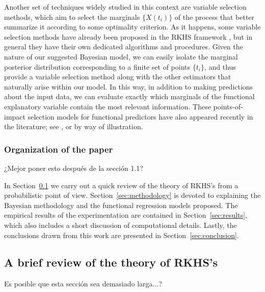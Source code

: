 \documentclass[ba]{imsart}
\numberwithin{equation}{section}
\theoremstyle{plain}
\newenvironment{comment}
{
\noindent \em \color{red}
}
{
\color{black}
}
\begin{document}
Another set of techniques widely studied in this context are variable selection methods, which aim to select the marginals \(\{X(t_i)\}\) of the process that better summarize it according to some optimality criterion. As it happens, some variable selection methods have already been proposed in the RKHS framework \citep[see for example][]{berrendero2019rkhs}, but in general they have their own dedicated algorithms and procedures. Given the nature of our suggested Bayesian model, we can easily isolate the marginal posterior distribution corresponding to a finite set of points \(\{t_i\}\), and thus provide a variable selection method along with the other estimators that naturally arise within our model. In this way, in addition to making predictions about the input data, we can evaluate exactly which marginals of the functional explanatory variable contain the most relevant information. These points-of-impact selection models for functional predictors have also appeared recently in the literature; see \citet{poss2020superconsistent}, \citet{berrendero2016variable} or \citet{ferraty2010most} by way of illustration.

\subsubsection{Organization of the paper}

\begin{comment}
¿Mejor poner esto después de la sección 1.1?
\end{comment}

In Section~\ref{sec:rkhs} we carry out a quick review of the theory of RKHS's from a probabilistic point of view. Section~\ref{sec:methodology} is devoted to explaining the Bayesian methodology and the functional regression models proposed. The empirical results of the experimentation are contained in Section~\ref{sec:results}, which also includes a short discussion of computational details. Lastly, the conclusions drawn from this work are presented in Section~\ref{sec:conclusion}.

\subsection{A brief review of the theory of RKHS's}\label{sec:rkhs}

\begin{comment}
  Es posible que esta sección sea demasiado larga...?
\end{comment}
\end{document}
